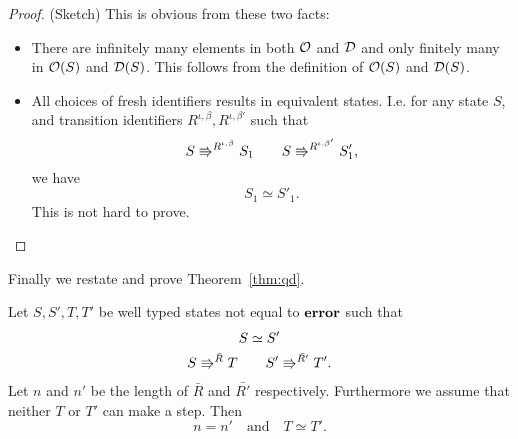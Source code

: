 \begin{proof}{(Sketch)}
  This is obvious from these two facts:
  \begin{itemize}
    \item There are infinitely many elements in both $\mathcal{O}$ and $\mathcal{D}$ and
      only finitely many in $\mathcal{O}(S)$ and $\mathcal{D}(S)$. This follows from
      the definition of $\mathcal{O}(S)$ and $\mathcal{D}(S)$.
    \item All choices of fresh identifiers results in equivalent states. I.e.
      for any state $S$, and transition identifiers $R^{\iota, \beta},
      R^{\iota, \beta'}$ such that 
      \begin{equation*}
        S \Rrightarrow^{R^{\iota, \beta}} S_1 \quad\quad S
        \Rrightarrow^{R^{\iota, \beta'}} S'_1,
      \end{equation*}
      we have
      \begin{equation*}
        S_1 \simeq S'_1.
      \end{equation*}
      This is not hard to prove.
  \end{itemize}
\end{proof}

Finally we restate and prove Theorem~\ref{thm:qd}.
\begin{theorem*}
  Let $S, S', T, T'$ be well typed states not equal to $\mbox{{\bf error}}$ such that
  \begin{equation*}
    \begin{gathered}
      S \simeq S' \\
      S \Rrightarrow^{\bar{R}} T \quad\quad S' \Rrightarrow^{\bar{R'}} T'.
    \end{gathered}
  \end{equation*}
  Let $n$ and $n'$ be the length of $\bar{R}$ and $\bar{R'}$ respectively.
  Furthermore we assume that neither $T$ or $T'$ can make a step.  Then
  \begin{equation*}
    n = n' \quad \text{and} \quad T \simeq T'.
  \end{equation*}
\end{theorem*}

